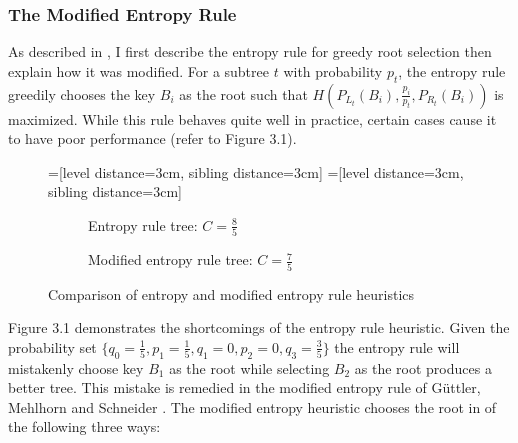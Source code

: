 \documentclass[]{beamer}
\theoremstyle{plain}
\begin{document}
\begin{frame} \frametitle{The Modified Entropy Rule}\label{The Modified Entropy Rule}

As described in \cite{guttler1980binary}, I first describe the entropy rule for greedy root selection then explain how it was modified. For a subtree $t$ with probability $p_t$, the entropy rule greedily chooses the key $B_i$ as the root such that $H(P_{L_t}(B_i), \frac{p_i}{p_t}, P_{R_t}(B_i))$ is maximized. While this rule behaves quite well in practice, certain cases cause it to have poor performance (refer to Figure 3.1). 


\begin{figure}[H]
\centering
=[level distance=3cm, sibling distance=3cm]
=[level distance=3cm, sibling distance=3cm]
\scriptsize
\begin{subfigure}{.46\textwidth}
\centering
{}
\caption{Entropy rule tree: $C=\frac{8}{5}$}
\end{subfigure}
\begin{subfigure}{.46\textwidth}
\centering
{}
\caption{Modified entropy rule tree: $C=\frac{7}{5}$}
\end{subfigure}
\caption{Comparison of entropy and modified entropy rule heuristics}
\end{figure}

Figure 3.1 demonstrates the shortcomings of the entropy rule heuristic. Given the probability set $\{q_0 = \frac{1}{5}, p_1 = \frac{1}{5}, q_1 = 0, p_2 = 0, q_3 = \frac{3}{5}\}$ the entropy rule will mistakenly choose key $B_1$ as the root while selecting $B_2$ as the root produces a better tree. This mistake is remedied in the modified entropy rule of G{\"u}ttler, Mehlhorn and Schneider \cite{guttler1980binary}. The modified entropy heuristic chooses the root in of the following three ways:



\end{frame}
\end{document}
